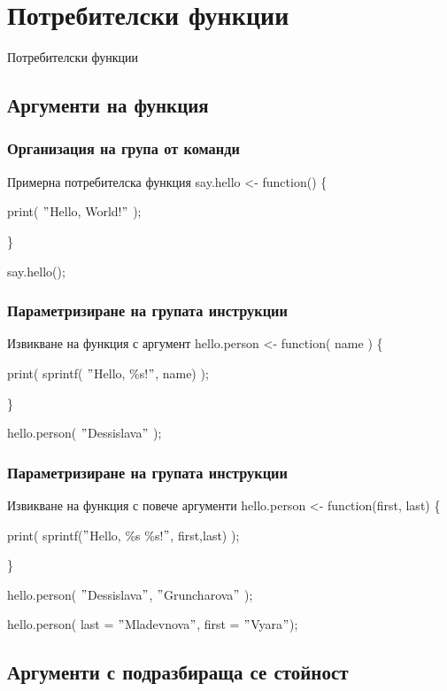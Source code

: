 \documentclass{beamer}
\begin{document}
\section{Потребителски функции}

\begin{frame}
\center \huge{Потребителски функции}
\end{frame}

\subsection{Аргументи на функция}

\begin{frame}
\frametitle{Организация на група от команди}
\begin{block}{Примерна потребителска функция}
say.hello <- function() \{

	print( $"$Hello, World!$"$ );

\}

say.hello();
\end{block}
\end{frame}

\begin{frame}
\frametitle{Параметризиране на групата инструкции}
\begin{block}{Извикване на функция с аргумент}
hello.person <- function( name ) \{

	print( sprintf( $"$Hello, \%s!$"$, name) );

\}

hello.person( $"$Dessislava$"$ );
\end{block}
\end{frame}

\begin{frame}
\frametitle{Параметризиране на групата инструкции}
\begin{block}{Извикване на функция с повече аргументи}
hello.person <- function(first, last) \{

	print( sprintf($"$Hello, \%s \%s!$"$, first,last) );

\}

hello.person( $"$Dessislava$"$, $"$Gruncharova$"$ );

hello.person( last = $"$Mladevnova$"$, first = $"$Vyara$"$);
\end{block}
\end{frame}

\subsection{Аргументи с подразбираща се стойност}
\end{document}
